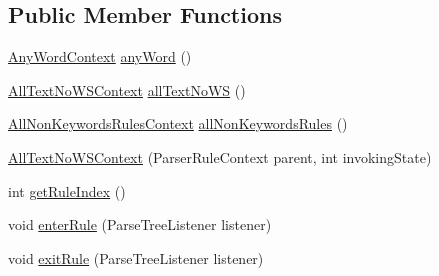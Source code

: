 \subsection*{Public Member Functions}
\begin{DoxyCompactItemize}
\item 
\hyperlink{classgov_1_1nasa_1_1jpf_1_1inspector_1_1client_1_1parser_1_1_console_grammar_parser_1_1_any_word_context}{Any\+Word\+Context} \hyperlink{classgov_1_1nasa_1_1jpf_1_1inspector_1_1client_1_1parser_1_1_console_grammar_parser_1_1_all_text_no_w_s_context_a96a799e96116d9005bb312030f9849e5}{any\+Word} ()
\item 
\hyperlink{classgov_1_1nasa_1_1jpf_1_1inspector_1_1client_1_1parser_1_1_console_grammar_parser_1_1_all_text_no_w_s_context}{All\+Text\+No\+W\+S\+Context} \hyperlink{classgov_1_1nasa_1_1jpf_1_1inspector_1_1client_1_1parser_1_1_console_grammar_parser_1_1_all_text_no_w_s_context_ac2f9ab95b0abb526866980a7359d960d}{all\+Text\+No\+WS} ()
\item 
\hyperlink{classgov_1_1nasa_1_1jpf_1_1inspector_1_1client_1_1parser_1_1_console_grammar_parser_1_1_all_non_keywords_rules_context}{All\+Non\+Keywords\+Rules\+Context} \hyperlink{classgov_1_1nasa_1_1jpf_1_1inspector_1_1client_1_1parser_1_1_console_grammar_parser_1_1_all_text_no_w_s_context_a512760c0991b7ab73fb11c1f28c96f08}{all\+Non\+Keywords\+Rules} ()
\item 
\hyperlink{classgov_1_1nasa_1_1jpf_1_1inspector_1_1client_1_1parser_1_1_console_grammar_parser_1_1_all_text_no_w_s_context_a568c4ebaf358724894d1dd989fb15ce7}{All\+Text\+No\+W\+S\+Context} (Parser\+Rule\+Context parent, int invoking\+State)
\item 
int \hyperlink{classgov_1_1nasa_1_1jpf_1_1inspector_1_1client_1_1parser_1_1_console_grammar_parser_1_1_all_text_no_w_s_context_adda8e7f298d8d2552548535a43ccf368}{get\+Rule\+Index} ()
\item 
void \hyperlink{classgov_1_1nasa_1_1jpf_1_1inspector_1_1client_1_1parser_1_1_console_grammar_parser_1_1_all_text_no_w_s_context_ae15993a574b333bc7c4129636b8c609c}{enter\+Rule} (Parse\+Tree\+Listener listener)
\item 
void \hyperlink{classgov_1_1nasa_1_1jpf_1_1inspector_1_1client_1_1parser_1_1_console_grammar_parser_1_1_all_text_no_w_s_context_a9abfaed3fa2fd33601c38030979f5699}{exit\+Rule} (Parse\+Tree\+Listener listener)
\end{DoxyCompactItemize}
